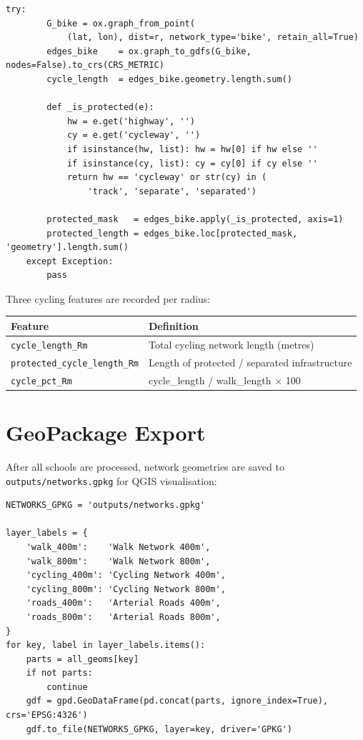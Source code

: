 \documentclass[11pt,a4paper,openany]{book}
\begin{document}
\begin{lstlisting}[style=python, caption={Cycling network and protected infrastructure detection.}]
    try:
        G_bike = ox.graph_from_point(
            (lat, lon), dist=r, network_type='bike', retain_all=True)
        edges_bike    = ox.graph_to_gdfs(G_bike, nodes=False).to_crs(CRS_METRIC)
        cycle_length  = edges_bike.geometry.length.sum()

        def _is_protected(e):
            hw = e.get('highway', '')
            cy = e.get('cycleway', '')
            if isinstance(hw, list): hw = hw[0] if hw else ''
            if isinstance(cy, list): cy = cy[0] if cy else ''
            return hw == 'cycleway' or str(cy) in (
                'track', 'separate', 'separated')

        protected_mask   = edges_bike.apply(_is_protected, axis=1)
        protected_length = edges_bike.loc[protected_mask, 'geometry'].length.sum()
    except Exception:
        pass
\end{lstlisting}

Three cycling features are recorded per radius:

\begin{center}
\begin{tabular}{L{5.5cm} L{7.5cm}}
\toprule
\textbf{Feature} & \textbf{Definition} \\
\midrule
\texttt{cycle\_length\_Rm}           & Total cycling network length (metres) \\
\texttt{protected\_cycle\_length\_Rm}& Length of protected / separated infrastructure \\
\texttt{cycle\_pct\_Rm}              & cycle\_length / walk\_length $\times$ 100 \\
\bottomrule
\end{tabular}
\end{center}

\section{GeoPackage Export}

After all schools are processed, network geometries are saved to \texttt{outputs/networks.gpkg} for QGIS visualisation:

\begin{lstlisting}[style=python, caption={GeoPackage layer export.}]
NETWORKS_GPKG = 'outputs/networks.gpkg'

layer_labels = {
    'walk_400m':    'Walk Network 400m',
    'walk_800m':    'Walk Network 800m',
    'cycling_400m': 'Cycling Network 400m',
    'cycling_800m': 'Cycling Network 800m',
    'roads_400m':   'Arterial Roads 400m',
    'roads_800m':   'Arterial Roads 800m',
}
for key, label in layer_labels.items():
    parts = all_geoms[key]
    if not parts:
        continue
    gdf = gpd.GeoDataFrame(pd.concat(parts, ignore_index=True), crs='EPSG:4326')
    gdf.to_file(NETWORKS_GPKG, layer=key, driver='GPKG')
\end{lstlisting}
\end{document}
